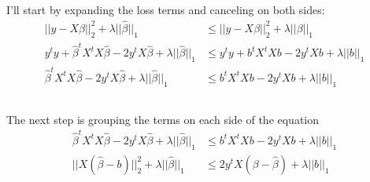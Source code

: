 \begin{frame}[fragile] \frametitle{}

I'll start by expanding the loss terms and canceling on both sides:
\begin{align*}
|| y - X\widehat{\beta} ||_2^2 + \lambda ||\widehat{\beta}||_1 &\leq || y - X\beta ||_2^2 + \lambda ||\beta||_1 \\
y^t y + \widehat{\beta}^t X^t X \widehat{\beta} - 2 y^t X \widehat{\beta} + \lambda ||\widehat{\beta}||_1
&\leq y^t y + b^t X^t X b - 2 y^t X b + \lambda ||b||_1\\
\widehat{\beta}^t X^t X \widehat{\beta} - 2 y^t X \widehat{\beta} + \lambda ||\widehat{\beta}||_1
&\leq b^t X^t X b - 2 y^t X b + \lambda ||b||_1\\
\end{align*}

\end{frame}

\begin{frame}[fragile] \frametitle{}

The next step is grouping the terms on each side of the equation
\begin{align*}
\widehat{\beta}^t X^t X \widehat{\beta} - 2 y^t X \widehat{\beta} + \lambda ||\widehat{\beta}||_1
&\leq b^t X^t X b - 2 y^t X b + \lambda ||b||_1\\
|| X (\widehat{\beta} - b) ||_2^2 + \lambda ||\widehat{\beta}||_1
&\leq 2 y^t X (\beta - \widehat{\beta}) + \lambda ||b||_1
\end{align*}

\end{frame}














